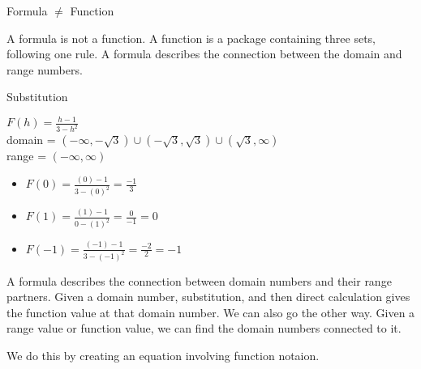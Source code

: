 \documentclass{ximera}
\begin{document}
\begin{warning}  Formula $\ne$ Function 

A formula is not a function.  A function is a package containing three sets, following one rule.  A formula describes the connection between the domain and range numbers.

\end{warning}





\begin{procedure}   Substitution 

$F(h) = \frac{h-1}{3-h^2}$ \\
domain = $(-\infty, -\sqrt{3}) \cup (-\sqrt{3}, \sqrt{3}) \cup (\sqrt{3}, \infty)$ \\
range = $(-\infty, \infty)$


\begin{itemize}
\item $F(0) = \frac{(0) - 1}{3 - (0)^2} = \frac{-1}{3}$
\item $F(1) = \frac{(1) - 1}{0 - (1)^2} = \frac{0}{-1} = 0$
\item $F(-1) = \frac{(-1) - 1}{3 - (-1)^2} = \frac{-2}{2} = -1$
\end{itemize}

\end{procedure}



A formula describes the connection between domain numbers and their range partners.  Given a domain number, substitution, and then direct calculation gives the function value at that domain number.  We can also go the other way.  Given a range value or function value, we can find the domain numbers connected to it.

We do this by creating an equation involving function notaion.
\end{document}
